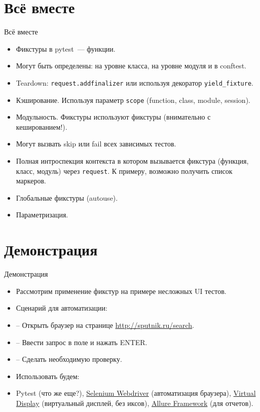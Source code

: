 \documentclass{beamer}
\begin{document}
\section{Всё вместе}
\begin{frame}[fragile]{Всё вместе}
	\begin{itemize}
		\item Фикстуры в pytest~--- функции.
		\pause \item Могут быть определены: на уровне класса, на уровне модуля и в conftest.
		\pause \item Teardown: \verb|request.addfinalizer| или используя декоратор \verb|yield_fixture|.
		\pause \item Кэширование. Используя параметр \verb|scope| (function, class, module, session).
		\pause \item Модульность. Фикстуры используют фикстуры (внимательно с кешированием!).
		\pause \item Могут вызвать skip или fail всех зависимых тестов.
		\pause \item Полная интроспекция контекста в котором вызывается фикстура (функция, класс, модуль) через \verb|request|.
			К примеру, возможно получить список маркеров.
		\pause \item Глобальные фикстуры (autouse).
		\pause \item Параметризация.
	\end{itemize}
\end{frame}

\section{Демонстрация}
\begin{frame}[fragile]{Демонстрация}
	\begin{itemize}
	\item Рассмотрим применение фикстур на примере несложных UI тестов.
	\pause \item Сценарий для автоматизации:
	\pause \item -- Открыть браузер на странице \url{http://sputnik.ru/search}.
	\pause \item -- Ввести запрос в поле и нажать ENTER.
	\pause \item -- Сделать необходимую проверку.
	\pause \item Использовать будем:
	\pause \item Pytest (что же еще?),
		\href{http://selenium-python.readthedocs.io/}{Selenium Webdriver} (автоматизация браузера),
		\href{https://github.com/ponty/pyvirtualdisplay}{Virtual Display} (виртуальный дисплей, без иксов),
		\href{http://allure.qatools.ru/}{Allure Framework} (для отчетов).
	\end{itemize}
\end{frame}
\end{document}
